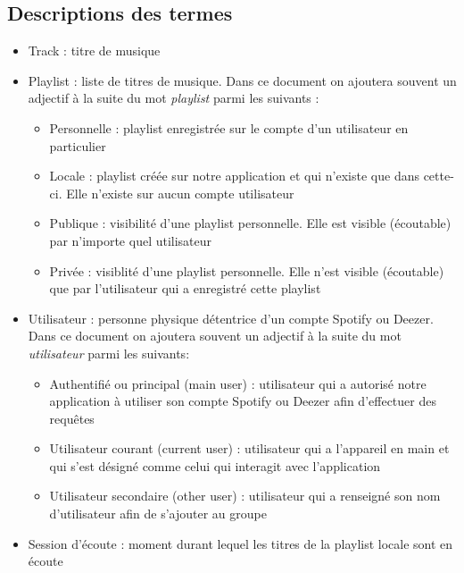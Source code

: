 \documentclass{article}
\begin{document}
		\subsection{Descriptions des termes}
		\begin{itemize}
			\item Track : titre de musique
			\item Playlist : liste de titres de musique. Dans ce document on ajoutera souvent un adjectif à la suite du mot \textit{playlist} parmi les suivants : 
			      \begin{itemize}
			      	\item Personnelle : playlist enregistrée sur le compte d'un utilisateur en particulier 
			      	\item Locale : playlist créée sur notre application et qui n'existe que dans cette-ci. Elle n'existe sur aucun compte utilisateur
			      	\item Publique : visibilité d'une playlist personnelle. Elle est visible (écoutable) par n'importe quel utilisateur
			      	\item Privée : visiblité d'une playlist personnelle. Elle n'est visible (écoutable) que par l'utilisateur qui a enregistré cette playlist
			      \end{itemize} \newpage
			\item Utilisateur : personne physique détentrice d'un compte Spotify ou Deezer. Dans ce document on ajoutera souvent un adjectif à la suite du mot \textit{utilisateur} parmi les suivants:
			      \begin{itemize}
			      	\item Authentifié ou principal (main user) : utilisateur qui a autorisé notre application à utiliser son compte Spotify ou Deezer afin d'effectuer des requêtes
			      	\item Utilisateur courant (current user) : utilisateur qui a l'appareil en main et qui s'est désigné comme celui qui interagit avec l'application
			      	\item Utilisateur secondaire (other user) : utilisateur qui a renseigné son nom d'utilisateur afin de s'ajouter au groupe
			      \end{itemize}
			\item Session d'écoute : moment durant lequel les titres de la playlist locale sont en écoute
		\end{itemize}
				
\end{document}
